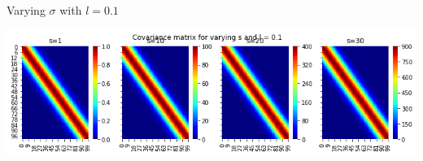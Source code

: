 \documentclass{beamer}
\begin{document}
\begin{frame}{Varying $\sigma$ with $l = 0.1$}
	\begin{center}
		\includegraphics[width=\linewidth, height=\textheight -120pt ,keepaspectratio]{gp/vary_s}
	\end{center}
	
\end{frame}
\end{document}
